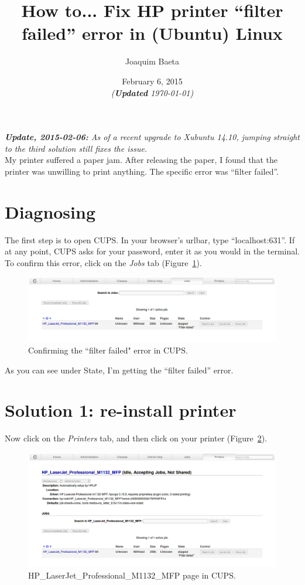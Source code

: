 \documentclass[12pt, a4paper]{article}
\title{\textbf{How to... Fix HP printer “filter failed” error in (Ubuntu) Linux }}
\author{Joaquim Baeta}
\date{February 6, 2015\\ \normalsize \emph{(\textbf{Updated} \today)}}
\begin{document}
\maketitle

\noindent \emph{\textbf{Update, 2015-02-06:} As of a recent upgrade to Xubuntu 14.10, jumping straight to the third solution still fixes the issue.}\\

\noindent My printer suffered a paper jam. After releasing the paper, I found that the printer was unwilling to print anything. The specific error was “filter failed”.

\section*{Diagnosing}

The first step is to open CUPS. In your browser's urlbar, type “localhost:631”. If at any point, CUPS asks for your password, enter it as you would in the terminal. To confirm this error, click on the \emph{Jobs} tab (Figure~\ref{fig1}). 

\begin{figure}[h]
  \centering
  \includegraphics[width=1\textwidth]{imgs/Filter_failed_1.png}
  \caption{Confirming the ``filter failed" error in CUPS.}
  \label{fig1}
\end{figure}

\noindent As you can see under State, I'm getting the “filter failed” error.

\section*{Solution 1: re-install printer}

Now click on the \emph{Printers} tab, and then click on your printer (Figure~\ref{fig2}).

\newpage
\begin{figure}[h]
  \centering
  \includegraphics[width=1\textwidth]{imgs/Filter_failed_2.png}
  \caption{HP\_LaserJet\_Professional\_M1132\_MFP page in CUPS.}
  \label{fig2}
\end{figure}
\end{document}

